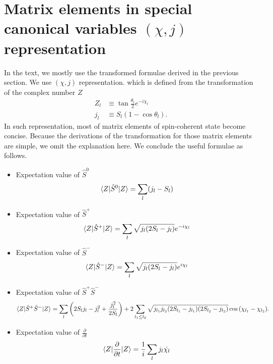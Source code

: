 \documentclass[11pt]{book} %
\begin{document}
\section{Matrix elements in special canonical variables $(\chi,j)$ representation}
\label{formula2}
In the text, we mostly use the transformed formulae derived in the previous section.
We use $(\chi,j)$ representation. which is defined from the transformation of the complex number $Z$
\begin{align}
  Z_l &\equiv \tan{\frac{\theta_l}{2}}e^{-i\chi_l} \\
  j_l &\equiv S_l(1-\cos{\theta}_l) .
\end{align}
In such representation, most of matrix elements of spin-coherent state become concise. Because the derivations of the transformation for those matrix elements are simple, we omit the explanation here. We conclude the useful formulae as follows.
\begin{framed}
  \begin{itemize}
 \item Expectation value of $\hat{S}^0$
\begin{equation}
     \braket{Z|\hat{S}^0|Z} = \sum_l (j_l-S_l)
\end{equation}
 \item Expectation value of $\hat{S}^+$
\begin{equation}
     \braket{Z|\hat{S}^+|Z} = \sum_l \sqrt{j_l(2S_l-j_l)}e^{-i\chi_l}
\end{equation}
 \item Expectation value of $\hat{S}^-$
\begin{equation}
     \braket{Z|\hat{S}^-|Z} = \sum_l \sqrt{j_l(2S_l-j_l)}e^{i\chi_l}
\end{equation}
 \item Expectation value of $\hat{S}^+\hat{S}^-$
\begin{equation}
    \braket{Z|\hat{S}^+\hat{S}^-|Z} = \sum_l \left( 2S_l j_l - j_l^2 +\frac{j_l^2}{2S_l} \right) 
+ 2\sum_{l_1\le l_2} \sqrt{j_{l_1}j_{l_2}(2S_{l_1}-j_{l_1})(2S_{l_2}-j_{l_2})}\cos{(\chi_{l_1}-\chi_{l_2})}   .
\end{equation}
 \item Expectation value of $\frac{\partial}{\partial t}$
\begin{equation}
       \braket{Z|\frac{\partial}{\partial t}|Z} = \frac{1}{i}\sum_l j_l \dot{\chi_l}
	\label{ddt2}
\end{equation}
\end{itemize}
\end{framed}
\end{document}
